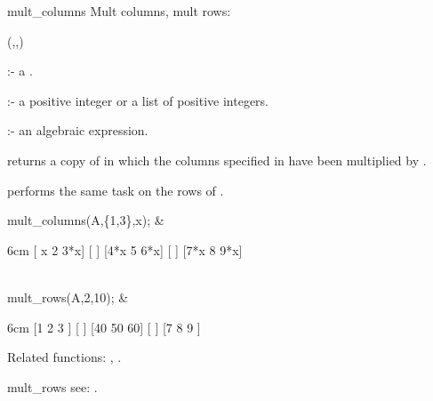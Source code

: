 \begin{Operator}{mult_columns}
Mult columns, mult rows:

\begin{Syntax}
(,,)
\end{Syntax}

       :- a . 

 :- a positive integer or a list of positive 
                       integers. 

         :- an algebraic expression.

 returns a copy of  in which the 
columns specified in  have been multiplied by 
. 

 performs the same task on the rows of .

\begin{Examples}

mult_columns(A,\{1,3\},x); &
\begin{multilineoutput}{6cm}
[ x   2  3*x]
[           ]
[4*x  5  6*x]
[           ]
[7*x  8  9*x]
\end{multilineoutput}\\

mult_rows(A,2,10); &
\begin{multilineoutput}{6cm}
[1   2   3 ]
[          ]
[40  50  60]
[          ]
[7   8   9 ]
\end{multilineoutput}

\end{Examples}

Related functions: , .

\end{Operator}


\begin{Operator}{mult_rows}
see:  .
\end{Operator}


